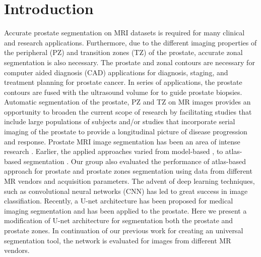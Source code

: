 \section{Introduction}
\label{sec:intro}
Accurate prostate segmentation on MRI datasets is required for many clinical and research 
applications. Furthermore, due to the different imaging properties of the peripheral (PZ) 
and transition zones (TZ) of the prostate, accurate zonal segmentation is also necessary. 
The prostate and zonal contours are necessary for computer aided diagnosis (CAD)
applications for diagnosis, staging, and treatment planning for prostate cancer. In 
series of applications, the prostate contours are fused with the ultrasound volume for 
to guide prostate biopsies. Automatic segmentation of the prostate, PZ and TZ on MR 
images provides an opportunity to broaden the current scope of research by facilitating 
studies that include large populations of subjects and/or studies that incorporate 
serial imaging of the prostate to provide a longitudinal picture of disease 
progression and response.  
Prostate MRI image segmentation has been an area of intense research \cite{litjens2014evaluation}. Earlier, the 
applied approaches varied from model-based \cite{chowdhury2012concurrent,toth2012multifeature},
 to atlas-based segmentation
\cite{4_klein2008automatic,5_cheng2014atlas, 6_xie2014low, 7_tian2015fully, 8_korsager2015use, 9_chilali2016gland}.
 Our group also evaluated the performance of atlas-based approach for prostate and prostate zones 
segmentation using data from different MR vendors and acquisition parameters\cite{10_padgett2018towards}. The advent 
of deep learning techniques, such as convolutional neural networks (CNN) has led to great success 
in image classifiation\cite{11_krizhevsky2012imagenet,12_simonyan2011immediate}. Recently, 
a U-net architecture has been proposed\cite{13_ronneberger2015u} for medical imaging 
segmentation and has been applied to the prostate\cite{14_meyer2018automatic}.
Here we present a modification of U-net architecture for segmentation both 
the prostate and prostate zones. In continuation of our previous work for creating an 
universal segmentation tool, the network is evaluated for images from different MR vendors.  
